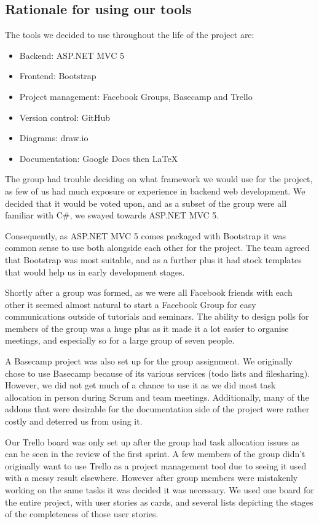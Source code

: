 \documentclass[a4paper,titlepage,12pt]{article}
\begin{document}
\newpage

\subsection{Rationale for using our tools}

The tools we decided to use throughout the life of the project are:

\begin{itemize}
	\item Backend: ASP.NET MVC 5
	\item Frontend: Bootstrap
	\item Project management: Facebook Groups, Basecamp and Trello
	\item Version control: GitHub
	\item Diagrams: draw.io
	\item Documentation: Google Docs then \LaTeX
\end{itemize}

The group had trouble deciding on what framework we would use for the project,
as few of us had much exposure or experience in backend web development. We
decided that it would be voted upon, and as a subset of the group were all
familiar with C\#, we swayed towards ASP.NET MVC 5.

Consequently, as ASP.NET MVC 5 comes packaged with Bootstrap it was common
sense to use both alongside each other for the project. The team agreed that
Bootstrap was most suitable, and as a further plus it had stock templates that
would help us in early development stages.

Shortly after a group was formed, as we were all Facebook friends with each
other it seemed almost natural to start a Facebook Group for easy
communications outside of tutorials and seminars. The ability to design polls
for members of the group was a huge plus as it made it a lot easier to organise
meetings, and especially so for a large group of seven people.

A Basecamp project was also set up for the group assignment. We originally
chose to use Basecamp because of its various services (todo lists and
filesharing). However, we did not get much of a chance to use it as we did most
task allocation in person during Scrum and team meetings. Additionally, many of
the addons that were desirable for the documentation side of the project were
rather costly and deterred us from using it.

Our Trello board was only set up after the group had task allocation issues as
can be seen in the review of the first sprint. A few members of the group
didn't originally want to use Trello as a project management tool due to seeing
it used with a messy result elsewhere. However after group members were
mistakenly working on the same tasks it was decided it was necessary. We used
one board for the entire project, with user stories as cards, and several lists
depicting the stages of the completeness of those user stories.
\end{document}
